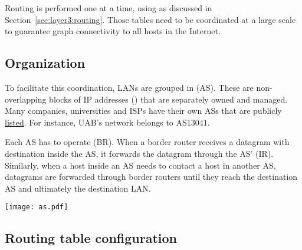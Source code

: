 Routing is performed one  at a time, using  
as discussed in Section~\ref{sec:layer3:routing}. Those tables need to be coordinated at a large 
scale to guarantee graph connectivity to all hosts in the Internet.


\subsection{Organization}

To facilitate this coordination, LANs are grouped in  (AS).
These are non-overlapping blocks of IP addresses () that are separately owned and managed.
Many companies, universities and ISPs have their own ASs that are publicly 
\href{https://2ip.io/analytics/asn-list/}{\underline{listed}}. For instance, UAB's network belongs to
AS13041.

Each AS has to operate  (BR). When a border router receives a datagram 
with destination inside the AS, it forwards the datagram through the AS'  (IR).
Similarly, when a host inside an AS needs to contact a host in another AS, datagrams are forwarded through border routers
until they reach the destination AS and ultimately the destination LAN.

\begin{center}
  \vspace{-0.2cm}
 \texttt{[image: as.pdf]}
 \vspace{-0.75cm}
\end{center}

\subsection{Routing table configuration}

